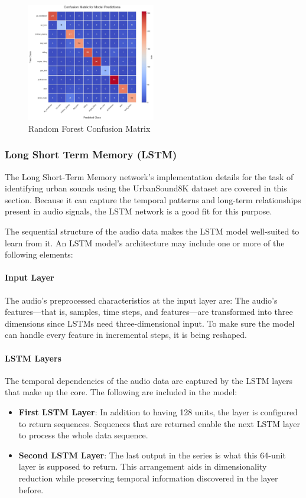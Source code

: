 \documentclass[conference]{IEEEtran}
\begin{document}
\begin{figure}[htbp]
\centerline{\includegraphics[width=0.5\textwidth]{Images/RFgraph.png}}
\caption{Random Forest Confusion Matrix}
\label{fig:RFconfusion}
\end{figure}

\subsubsection{Long Short Term Memory (LSTM)}
The Long Short-Term Memory network's implementation details for the task of identifying urban sounds using the UrbanSound8K dataset are covered in this section. Because it can capture the temporal patterns and long-term relationships present in audio signals, the LSTM network is a good fit for this purpose.


The sequential structure of the audio data makes the LSTM model well-suited to learn from it. An LSTM model's architecture may include one or more of the following elements:


\paragraph{Input Layer}
The audio's preprocessed characteristics at the input layer are: The audio's features—that is, samples, time steps, and features—are transformed into three dimensions since LSTMs need three-dimensional input. To make sure the model can handle every feature in incremental steps, it is being reshaped.


\paragraph{LSTM Layers}
The temporal dependencies of the audio data are captured by the LSTM layers that make up the core. The following are included in the model:

\begin{itemize}
    \item \textbf{First LSTM Layer}: In addition to having 128 units, the layer is configured to return sequences. Sequences that are returned enable the next LSTM layer to process the whole data sequence.


    \item \textbf{Second LSTM Layer}: The last output in the series is what this 64-unit layer is supposed to return. This arrangement aids in dimensionality reduction while preserving temporal information discovered in the layer before.

\end{itemize}
\end{document}
